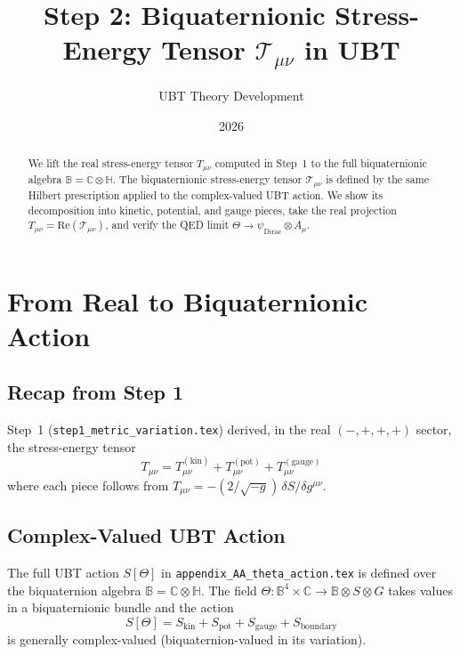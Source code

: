 \documentclass[12pt]{article}
\title{Step 2: Biquaternionic Stress-Energy Tensor $\mathcal{T}_{\mu\nu}$ in UBT}
\author{UBT Theory Development}
\date{2026}
\begin{document}
\maketitle

\begin{abstract}
We lift the real stress-energy tensor $T_{\mu\nu}$ computed in Step~1
to the full biquaternionic algebra $\mathbb{B} = \mathbb{C}\otimes\mathbb{H}$.
The biquaternionic stress-energy tensor $\mathcal{T}_{\mu\nu}$ is defined by the
same Hilbert prescription applied to the complex-valued UBT action.
We show its decomposition into kinetic, potential, and gauge pieces,
take the real projection $T_{\mu\nu} = \mathrm{Re}(\mathcal{T}_{\mu\nu})$,
and verify the QED limit $\Theta \to \psi_{\mathrm{Dirac}}\otimes A_\mu$.
\end{abstract}

\tableofcontents

\section{From Real to Biquaternionic Action}

\subsection{Recap from Step 1}

Step~1 (\texttt{step1\_metric\_variation.tex}) derived, in the real $(-,+,+,+)$
sector, the stress-energy tensor
\begin{equation}
  T_{\mu\nu}
  = T^{(\mathrm{kin})}_{\mu\nu}
  + T^{(\mathrm{pot})}_{\mu\nu}
  + T^{(\mathrm{gauge})}_{\mu\nu}
\end{equation}
where each piece follows from $T_{\mu\nu} = -(2/\sqrt{-g})\,\delta S/\delta g^{\mu\nu}$.

\subsection{Complex-Valued UBT Action}

The full UBT action $S[\Theta]$ in \texttt{appendix\_AA\_theta\_action.tex}
is defined over the biquaternion algebra $\mathbb{B} = \mathbb{C}\otimes\mathbb{H}$.
The field $\Theta: \mathbb{B}^4\times\mathbb{C} \to \mathbb{B}\otimes S\otimes G$
takes values in a biquaternionic bundle and the action
\begin{equation}
  S[\Theta] = S_{\mathrm{kin}} + S_{\mathrm{pot}} + S_{\mathrm{gauge}}
              + S_{\mathrm{boundary}}
\end{equation}
is generally complex-valued (biquaternion-valued in its variation).
\end{document}
